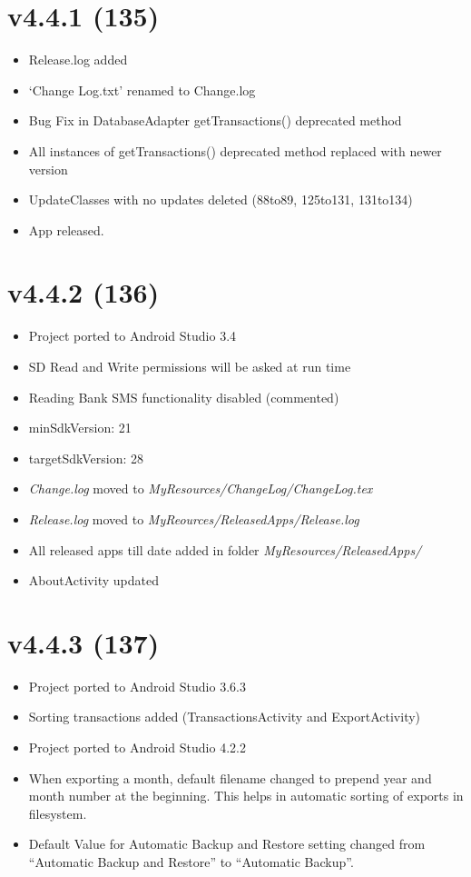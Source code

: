 \documentclass{article}
\begin{document}
    \section{v4.4.1 (135)}\label{sec:135}
    \begin{itemize}
        \item Release.log added
        \item `Change Log.txt' renamed to Change.log
        \item Bug Fix in DatabaseAdapter getTransactions() deprecated method
        \item All instances of getTransactions() deprecated method replaced with newer version
        \item UpdateClasses with no updates deleted (88to89, 125to131, 131to134)
        \item App released.
    \end{itemize}

    \section{v4.4.2 (136)}\label{sec:136}
    \begin{itemize}
        \item Project ported to Android Studio 3.4
        \item SD Read and Write permissions will be asked at run time
        \item Reading Bank SMS functionality disabled (commented)
        \item minSdkVersion: 21
        \item targetSdkVersion: 28
        \item \textit{Change.log} moved to \textit{MyResources/ChangeLog/ChangeLog.tex}
        \item \textit{Release.log} moved to \textit{MyReources/ReleasedApps/Release.log}
        \item All released apps till date added in folder \textit{MyResources/ReleasedApps/}
        \item AboutActivity updated
    \end{itemize}


    \section{v4.4.3 (137)}\label{sec:137}
    \begin{itemize}
        \item Project ported to Android Studio 3.6.3
        \item Sorting transactions added (TransactionsActivity and ExportActivity)
        \item Project ported to Android Studio 4.2.2
        \item When exporting a month, default filename changed to prepend year and month number at the beginning.
        This helps in automatic sorting of exports in filesystem.
        \item Default Value for Automatic Backup and Restore setting changed from ``Automatic Backup and Restore'' to ``Automatic Backup''.
    \end{itemize}
\end{document}

